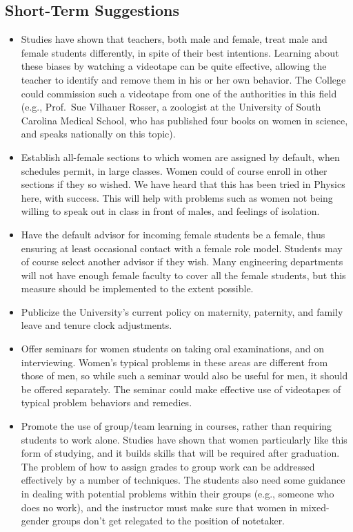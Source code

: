 \subsection{Short-Term Suggestions}
\begin{itemize}

\item
Studies have shown that teachers, both male and female, treat
male and female students differently, in spite of their best
intentions.  
Learning about these biases by  watching a videotape
can be quite effective, allowing the teacher to identify and
remove them in his or her own behavior.
The College could commission such a videotape from one of
the authorities in this field
(e.g., Prof.\ Sue Vilhauer Rosser,
 a zoologist at the University of South Carolina Medical
School, who has published four books on women in science,
and speaks nationally on this topic).

\item 
Establish all-female sections to which women are assigned by default,
when schedules permit, in large classes.  Women could of course enroll
in other sections if they so wished.
We have heard  that this has been tried in Physics here, with
success.
This will help with problems such as women not being willing to speak
out in class in front of males, and feelings of isolation.

\item 
Have the default advisor for incoming  female students be a female,
thus ensuring at least occasional contact with a female 
role model.
Students may of course select another advisor if they wish.
Many engineering departments will not have enough female faculty
to cover all the female students, but this measure should be 
implemented to the extent possible.

\item
Publicize the University's current policy on maternity,
paternity, and family leave and tenure clock adjustments.

\item
Offer seminars for women students on taking oral examinations,
and on interviewing.  Women's typical problems in these
areas are different from those of men, so while such a seminar
would also be useful for men, it
should be offered separately.
The seminar could make effective use of videotapes of typical problem
behaviors and remedies.

\item
Promote the use of group/team learning in courses, rather than
requiring students to work alone.  Studies have shown that
women particularly like this form of studying, and it builds skills
that will be required after graduation.  The problem of how
to assign grades to group work can be addressed effectively
by a number of techniques.  The students also need some guidance
in dealing with potential problems within their groups (e.g.,
someone who does no work), and the instructor must make
sure that women in mixed-gender groups don't get relegated to
the position of notetaker.



\end{itemize}
